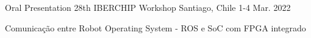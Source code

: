 

\begin{cventries}

  \cventry
    {Oral Presentation} %
    {28th IBERCHIP Workshop} %
    {Santiago, Chile} %
    {1-4 Mar. 2022} %
    {
      \begin{cvitems} %
        \item {Comunicação entre Robot Operating System - ROS e SoC com FPGA integrado}
      \end{cvitems}
    }


\end{cventries}
